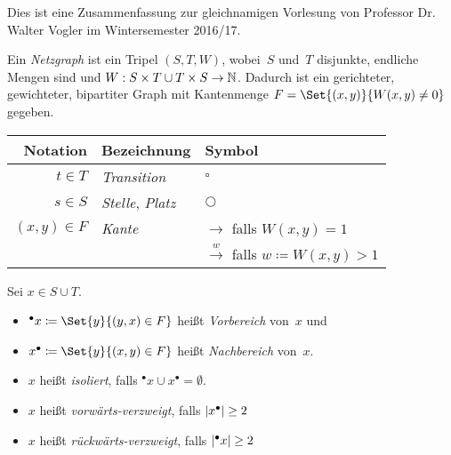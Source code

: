 \documentclass{cheat-sheet}
\newcommand{\transition}{\square} %
\newcommand{\place}{\bigcirc} %
\newcommand{\preset}[1]{{}^\bullet{#1}} %
\newcommand{\postset}[1]{{#1}^\bullet} %
\begin{document}
\raggedcolumns %


Dies ist eine Zusammenfassung zur gleichnamigen Vorlesung von Professor Dr. Walter Vogler im Wintersemester 2016/17.


\begin{defn}
  Ein \emph{Netzgraph} ist ein Tripel $(S, T, W)$, wobei~$S$ und~$T$ disjunkte, endliche Mengen sind und $W : S \times T \cup T \times S \to \mathbb{N}$.
  Dadurch ist ein gerichteter, gewichteter, bipartiter Graph mit Kantenmenge $F = \Set{(x, y)}{W(x, y) \neq 0}$ gegeben.
\end{defn}

\begin{center}
  \begin{tabular}{r l l}
    Notation & Bezeichnung & Symbol \\ \hline
    $t \in T$ & \emph{Transition} & $\transition$ \\
    $s \in S$ & \emph{Stelle}, \emph{Platz} & $\place$ \\
    $(x, y) \in F$ & \emph{Kante} & $\xrightarrow{\enspace}$ falls $W(x, y) = 1$ \\
    && $\xrightarrow{w}$ falls $w \coloneqq W(x, y) > 1$
  \end{tabular}
\end{center}

\begin{defn}
  Sei $x \in S \cup T$.
  \begin{itemize}
    \item $\preset{x} \coloneqq \Set{y}{(y, x) \in F}$ heißt \emph{Vorbereich} von~$x$ und
    \item $\postset{x} \coloneqq \Set{y}{(x, y) \in F}$ heißt \emph{Nachbereich} von~$x$.
    \item $x$ heißt \emph{isoliert}, falls $\preset{x} \cup \postset{x} = \emptyset$.
    \item $x$ heißt \emph{vorwärts-verzweigt}, falls $\card{\postset{x}} \geq 2$ 
    \item $x$ heißt \emph{rückwärts-verzweigt}, falls $\card{\preset{x}} \geq 2$ 
  \end{itemize}
\end{defn}
\end{document}
